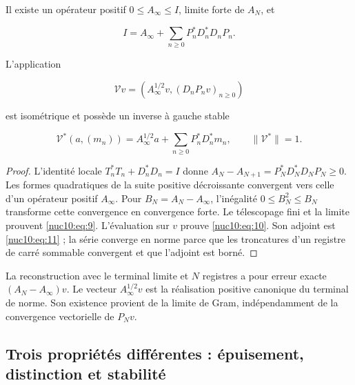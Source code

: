 \begin{theorem}
\label{nuclear:terminal-no-estacionario}
Il existe un opérateur positif \(0\leq A_\infty\leq I\), limite forte de \(A_N\), et



\begin{equation}
\boxed{I=A_\infty+\sum_{n\ge0}P_n^*D_n^*D_nP_n.}
\label{nuc10:eq:9}
\end{equation}



L'application



\begin{equation}
\boxed{\mathcal Vv=(A_\infty^{1/2}v,(D_nP_nv)_{n\ge0})}
\label{nuc10:eq:10}
\end{equation}



est isométrique et possède un inverse à gauche stable




\begin{equation}
\mathcal V^*(a,(m_n))=A_\infty^{1/2}a+
\sum_{n\ge0}P_n^*D_n^*m_n,\qquad\|\mathcal V^*\|=1.
\label{nuc10:eq:11}
\end{equation}



\end{theorem}
\begin{proof}
L’identité locale \(T_n^*T_n+D_n^*D_n=I\) donne
\(A_N-A_{N+1}=P_N^*D_N^*D_NP_N\geq0\). Les formes quadratiques de
la suite positive décroissante convergent vers celle d’un opérateur positif
\(A_\infty\). Pour \(B_N=A_N-A_\infty\), l’inégalité
\(0\leq B_N^2\leq B_N\) transforme cette convergence en convergence forte.
Le télescopage fini et la limite prouvent \eqref{nuc10:eq:9}. L’évaluation sur \(v\)
prouve \eqref{nuc10:eq:10}. Son adjoint est \eqref{nuc10:eq:11} ; la série converge en norme parce que
les troncatures d’un registre de carré sommable convergent et que l’adjoint est borné.
\end{proof}

La reconstruction avec le terminal limite et \(N\) registres a pour erreur
exacte \((A_N-A_\infty)v\). Le vecteur \(A_\infty^{1/2}v\) est la
réalisation positive canonique du terminal de norme. Son existence provient
de la limite de Gram, indépendamment de la convergence vectorielle de \(P_Nv\).


\subsection{Trois propriétés différentes : épuisement, distinction et stabilité}

